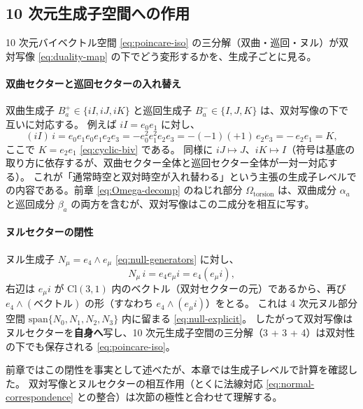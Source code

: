\documentclass[dvipdfmx,a4paper,oneside]{jsbook}
\numberwithin{equation}{chapter}
\begin{document}
\subsection{10 次元生成子空間への作用}

10 次元バイベクトル空間 \eqref{eq:poincare-iso} の三分解（双曲・巡回・ヌル）が双対写像 \eqref{eq:duality-map} の下でどう変形するかを、生成子ごとに見る。

\paragraph{双曲セクターと巡回セクターの入れ替え}
双曲生成子 \(B_a^{+} \in \{iI, iJ, iK\}\) と巡回生成子 \(B_a^{-} \in \{I, J, K\}\) は、双対写像の下で互いに対応する。
例えば \(iI = e_0 e_1\) に対し、
\begin{equation}
  (iI)\, i = e_0 e_1 e_0 e_1 e_2 e_3
  = -e_0^2 e_1^2 e_2 e_3
  = -(-1)(+1)\, e_2 e_3
  = -\, e_2 e_1
  = K,
  \label{eq:duality-hyperbolic-example}
\end{equation}
ここで \(K = e_2 e_1\) \eqref{eq:cyclic-biv} である。
同様に \(iJ \mapsto J\)、\(iK \mapsto I\)（符号は基底の取り方に依存するが、双曲セクター全体と巡回セクター全体が一対一対応する）。
これが「通常時空と双対時空が入れ替わる」という主張の生成子レベルでの内容である。前章 \eqref{eq:Omega-decomp} のねじれ部分 \(\Omega_{\mathrm{torsion}}\) は、双曲成分 \(\alpha_a\) と巡回成分 \(\beta_a\) の両方を含むが、双対写像はこの二成分を相互に写す。

\paragraph{ヌルセクターの閉性}
ヌル生成子 \(N_\mu = e_4 \wedge e_\mu\) \eqref{eq:null-generators} に対し、
\begin{equation}
  N_\mu\, i = e_4 e_\mu i = e_4 (e_\mu i),
  \label{eq:null-duality-closure}
\end{equation}
右辺は \(e_\mu i\) が \(\mathrm{Cl}(3,1)\) 内のベクトル（双対セクターの元）であるから、再び \(e_4 \wedge (\text{ベクトル})\) の形（すなわち \(e_4 \wedge (e_\mu i)\)）をとる。
これは 4 次元ヌル部分空間 \(\mathrm{span}\{N_0,N_1,N_2,N_3\}\) 内に留まる \eqref{eq:null-explicit}。
したがって双対写像はヌルセクターを\textbf{自身へ}写し、10 次元生成子空間の三分解（3 + 3 + 4）は双対性の下でも保存される \eqref{eq:poincare-iso}。

前章ではこの閉性を事実として述べたが、本章では生成子レベルで計算を確認した。
双対写像とヌルセクターの相互作用（とくに法線対応 \eqref{eq:normal-correspondence} との整合）は次節の極性と合わせて理解する。
\end{document}
